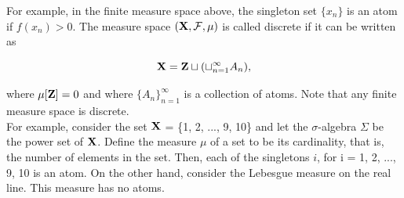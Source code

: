 \documentclass{homework}
\begin{document}
\begin{itemize}
    For example, in the finite measure space above, the singleton set $\{x_n\}$ is an atom if $f(x_n) > 0$. The measure space $({\bf X}, \mathcal{F},\mu)$ is called discrete if it can be written as 
    
    $$
    {\bf X} = {\bf Z} \sqcup (\sqcup_{n=1}^{\infty} A_n),
    $$
    
    where $\mu[{\bf Z}] = 0$ and where $\{A_n\}_{n=1}^{\infty}$ is a collection of atoms. Note that any finite measure space is discrete. \\
    
    For example, consider the set ${\bf X}$ = \{1, 2, ..., 9, 10\} and let the $\sigma$-algebra ${\displaystyle \Sigma }$ be the power set of ${\bf X}$. Define the measure ${\displaystyle \mu }$  of a set to be its cardinality, that is, the number of elements in the set. Then, each of the singletons ${i}$, for i = 1, 2, ..., 9, 10 is an atom. On the other hand, consider the Lebesgue measure on the real line. This measure has no atoms. \\
    
    
    
    
    
    

\end{itemize}
\end{document}
